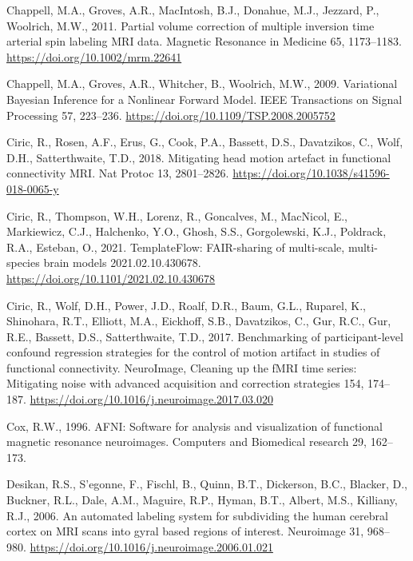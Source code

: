 \documentclass[
  12pt,
]{article}
\newlength{\cslhangindent}
\newlength{\cslentryspacingunit} %
\newenvironment{CSLReferences}[2] %
 {%
  \setlength{\parindent}{0pt}
  \ifodd #1
  \let\oldpar\par
  \def\par{\hangindent=\cslhangindent\oldpar}
  \fi
  \setlength{\parskip}{#2\cslentryspacingunit}
 }%
 {}
\begin{document}
\begin{CSLReferences}{1}{0}
\leavevmode{}%
Chappell, M.A., Groves, A.R., MacIntosh, B.J., Donahue, M.J., Jezzard, P., Woolrich, M.W., 2011. Partial volume correction of multiple inversion time arterial spin labeling {MRI} data. Magnetic Resonance in Medicine 65, 1173--1183. \url{https://doi.org/10.1002/mrm.22641}

\leavevmode{}%
Chappell, M.A., Groves, A.R., Whitcher, B., Woolrich, M.W., 2009. Variational {Bayesian} {Inference} for a {Nonlinear} {Forward} {Model}. IEEE Transactions on Signal Processing 57, 223--236. \url{https://doi.org/10.1109/TSP.2008.2005752}

\leavevmode{}%
Ciric, R., Rosen, A.F., Erus, G., Cook, P.A., Bassett, D.S., Davatzikos, C., Wolf, D.H., Satterthwaite, T.D., 2018. Mitigating head motion artefact in functional connectivity {MRI}. Nat Protoc 13, 2801--2826. \url{https://doi.org/10.1038/s41596-018-0065-y}

\leavevmode{}%
Ciric, R., Thompson, W.H., Lorenz, R., Goncalves, M., MacNicol, E., Markiewicz, C.J., Halchenko, Y.O., Ghosh, S.S., Gorgolewski, K.J., Poldrack, R.A., Esteban, O., 2021. {TemplateFlow}: {FAIR-sharing} of multi-scale, multi-species brain models 2021.02.10.430678. \url{https://doi.org/10.1101/2021.02.10.430678}

\leavevmode{}%
Ciric, R., Wolf, D.H., Power, J.D., Roalf, D.R., Baum, G.L., Ruparel, K., Shinohara, R.T., Elliott, M.A., Eickhoff, S.B., Davatzikos, C., Gur, R.C., Gur, R.E., Bassett, D.S., Satterthwaite, T.D., 2017. Benchmarking of participant-level confound regression strategies for the control of motion artifact in studies of functional connectivity. NeuroImage, Cleaning up the {fMRI} time series: {Mitigating} noise with advanced acquisition and correction strategies 154, 174--187. \url{https://doi.org/10.1016/j.neuroimage.2017.03.020}

\leavevmode{}%
Cox, R.W., 1996. AFNI: Software for analysis and visualization of functional magnetic resonance neuroimages. Computers and Biomedical research 29, 162--173.

\leavevmode{}%
Desikan, R.S., S'egonne, F., Fischl, B., Quinn, B.T., Dickerson, B.C., Blacker, D., Buckner, R.L., Dale, A.M., Maguire, R.P., Hyman, B.T., Albert, M.S., Killiany, R.J., 2006. An automated labeling system for subdividing the human cerebral cortex on {MRI} scans into gyral based regions of interest. Neuroimage 31, 968--980. \url{https://doi.org/10.1016/j.neuroimage.2006.01.021}


\end{CSLReferences}
\end{document}
